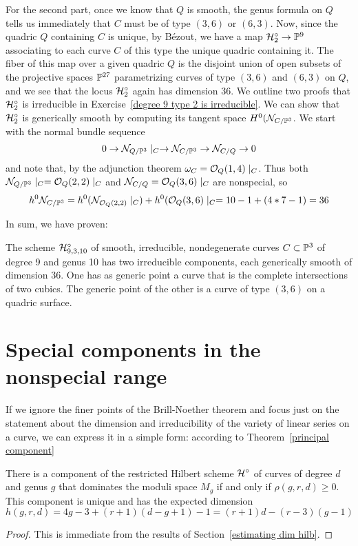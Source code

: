For the second part, once we know that $Q$ is smooth, the genus formula on $Q$ tells us immediately that $C$ must be of type $(3,6)$ or $(6,3)$. Now, since the quadric $Q$ containing $C$ is unique, by B\'ezout, we have a map $\cH^\circ_2 \to \PP^9$ associating to each curve $C$ of this type the unique quadric containing it. The fiber of this map over a given quadric $Q$ is the disjoint union of open subsets of the projective spaces $\PP^{27}$ parametrizing curves of type $(3,6)$ and $(6,3)$ on $Q$, and we see that the locus $\cH^\circ_2$ again has dimension 36. We outline two proofs that 
$\cH^\circ_2$ is irreducible in Exercise~\ref{degree 9 type 2 is irreducible}.
We can show that $\cH^\circ_2$ is generically smooth by computing its tangent space
$H^0(\sN_{C/\PP^3}$. We start with the normal bundle sequence
$$
0\to \sN_{Q/\PP^3}\mid_C \to \sN_{C/\PP^3} \to \sN_{C/Q} \to 0
$$
and note that, by the adjunction theorem $\omega_C = \sO_Q(1,4)\mid_C$.
Thus both $\sN_{Q/\PP^3}\mid_C = \sO_Q(2,2)\mid_C$ and
$\sN_{C/Q} = \sO_Q(3,6)\mid_C$ are nonspecial, so 
$$
h^0 \sN_{C/\PP^3} = h^0(\sN_{\sO_Q(2,2)}\mid_C ) + h^0(\sO_Q(3,6)\mid_C
= 10-1 + (4*7-1) = 36
$$

In sum, we have proven:
\begin{proposition}
 The scheme $\cH^\circ_{9,3,10}$ of smooth, irreducible, nondegenerate curves $C \subset \PP^3$ of degree 9 and genus 10 has two irreducible components, each generically smooth of dimension 36. One has as generic point a curve that is the complete intersections of two cubics. The generic point of the other is a curve of type $(3,6)$ on a quadric surface. \end{proposition}


 \section{Special components in the nonspecial range}

If we ignore the finer points of the Brill-Noether theorem and focus just on the statement about the dimension and irreducibility of the variety of linear series on a curve, we can express it in a simple form: according to Theorem~\ref{principal component} 

\begin{corollary}
 There is a component of the restricted Hilbert scheme $\cH^\circ$ of curves of degree $d$ and genus $g$ that dominates the moduli space $M_g$ if and only if $\rho(g,r,d)\geq 0$. This component is unique and has the expected dimension 
$$
h(g,r,d) = 4g-3 + (r+1)(d-g+1) - 1 = (r+1)d - (r-3)(g-1)
$$
\end{corollary}
\begin{proof}
  This is immediate from the results of Section~\ref{estimating dim hilb}.
\end{proof}
 
